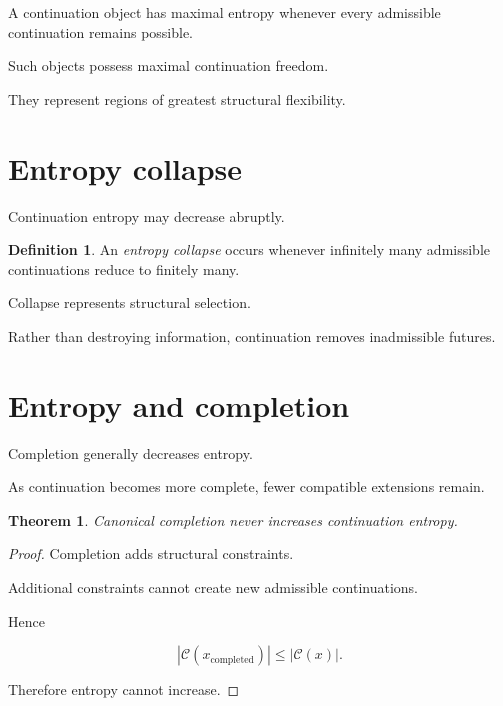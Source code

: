 \documentclass[13pt,openany]{book}
\theoremstyle{plain}
\newtheorem{theorem}{Theorem}[chapter]
\theoremstyle{definition}
\newtheorem{definition}{Definition}[chapter]
\begin{document}
A continuation object has maximal entropy whenever every admissible continuation remains possible.

Such objects possess maximal continuation freedom.

They represent regions of greatest structural flexibility.

\section{Entropy collapse}

Continuation entropy may decrease abruptly.

\begin{definition}

An \emph{entropy collapse} occurs whenever infinitely many admissible continuations reduce to finitely many.

\end{definition}

Collapse represents structural selection.

Rather than destroying information, continuation removes inadmissible futures.

\section{Entropy and completion}

Completion generally decreases entropy.

As continuation becomes more complete, fewer compatible extensions remain.

\begin{theorem}

Canonical completion never increases continuation entropy.

\end{theorem}

\begin{proof}

Completion adds structural constraints.

Additional constraints cannot create new admissible continuations.

Hence

\[
|\mathcal C(x_{\mathrm{completed}})|
\le
|\mathcal C(x)|.
\]

Therefore entropy cannot increase.

\end{proof}
\end{document}
